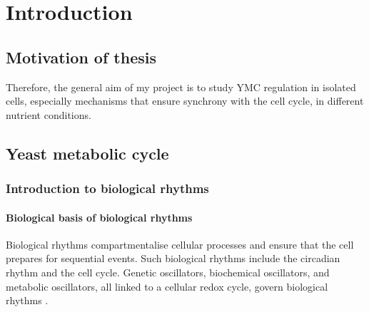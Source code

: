 
\chapter{Introduction}

\section{Motivation of thesis}

Therefore, the general aim of my project is to study YMC regulation in isolated cells, especially mechanisms that ensure synchrony with the cell cycle, in different nutrient conditions.


\section{Yeast metabolic cycle}
\label{sec:intro-ymc}

\subsection{Introduction to biological rhythms}
\label{subsec:intro-ymc-biological_rhythms}

\subsubsection{Biological basis of biological rhythms}
\label{subsubsec:intro-ymc-biological_rhythms-biological_basis}


Biological rhythms compartmentalise cellular processes and ensure that the cell prepares for sequential events.
Such biological rhythms include the circadian rhythm and the cell cycle.
Genetic oscillators, biochemical oscillators, and metabolic oscillators, all linked to a cellular redox cycle, govern biological rhythms \citep{mellorMolecularBasisMetabolic2016}.

